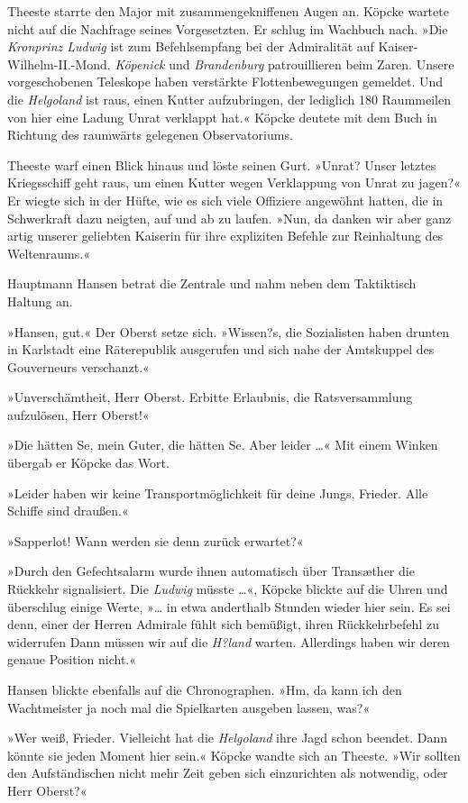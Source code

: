 Theeste starrte den Major mit zusammengekniffenen Augen an. Köpcke
wartete nicht auf die Nachfrage seines Vorgesetzten. Er schlug im
Wachbuch nach. »Die \emph{Kronprinz Ludwig} ist zum Befehlsempfang
bei der Admiralität auf Kaiser-Wilhelm-II.-Mond. \emph{Köpenick}
und \emph{Brandenburg} patrouillieren beim Zaren. Unsere
vorgeschobenen Teleskope haben verstärkte Flottenbewegungen
gemeldet. Und die \emph{Helgoland} ist raus, einen Kutter
aufzubringen, der lediglich 180 Raummeilen von hier eine Ladung
Unrat verklappt hat.« Köpcke deutete mit dem Buch in Richtung des
raumwärts gelegenen Observatoriums.

Theeste warf einen Blick hinaus und löste seinen Gurt. »Unrat?
Unser letztes Kriegsschiff geht raus, um einen Kutter wegen
Verklappung von Unrat zu jagen?« Er wiegte sich in der Hüfte, wie
es sich viele Offiziere angewöhnt hatten, die in Schwerkraft dazu
neigten, auf und ab zu laufen. »Nun, da danken wir aber ganz artig
unserer geliebten Kaiserin für ihre expliziten Befehle zur
Reinhaltung des Weltenraums.«

Hauptmann Hansen betrat die Zentrale und nahm neben dem Taktiktisch
Haltung an.

»Hansen, gut.« Der Oberst setze sich. »Wissen?s, die Sozialisten
haben drunten in Karlstadt eine Räterepublik ausgerufen und sich
nahe der Amtskuppel des Gouverneurs verschanzt.«

»Unverschämtheit, Herr Oberst. Erbitte Erlaubnis, die
Ratsversammlung aufzulösen, Herr Oberst!«

»Die hätten Se, mein Guter, die hätten Se. Aber leider …« Mit einem
Winken übergab er Köpcke das Wort.

»Leider haben wir keine Transportmöglichkeit für deine Jungs,
Frieder. Alle Schiffe sind draußen.«

»Sapperlot! Wann werden sie denn zurück erwartet?«

»Durch den Gefechtsalarm wurde ihnen automatisch über Transæther
die Rückkehr signalisiert. Die \emph{Ludwig} müsste …«, Köpcke
blickte auf die Uhren und überschlug einige Werte, »… in etwa
anderthalb Stunden wieder hier sein. Es sei denn, einer der Herren
Admirale fühlt sich bemüßigt, ihren Rückkehrbefehl zu widerrufen
Dann müssen wir auf die \emph{H?land} warten. Allerdings haben wir
deren genaue Position nicht.«

Hansen blickte ebenfalls auf die Chronographen. »Hm, da kann ich
den Wachtmeister ja noch mal die Spielkarten ausgeben lassen,
was?«

»Wer weiß, Frieder. Vielleicht hat die \emph{Helgoland} ihre Jagd
schon beendet. Dann könnte sie jeden Moment hier sein.« Köpcke
wandte sich an Theeste. »Wir sollten den Aufständischen nicht mehr
Zeit geben sich einzurichten als notwendig, oder Herr Oberst?«

